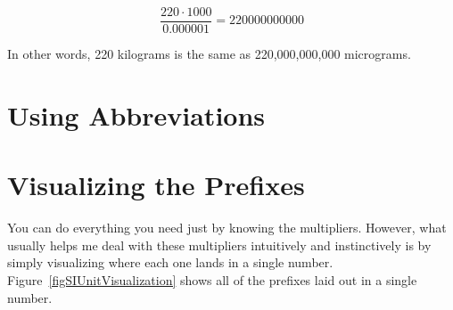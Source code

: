$$\frac{220 \cdot 1000}{0.000001} = 220000000000$$

In other words, 220 kilograms is the same as 220,000,000,000 micrograms.

\section{Using Abbreviations}

\section{Visualizing the Prefixes}

You can do everything you need just by knowing the multipliers.
However, what usually helps me deal with these multipliers intuitively and instinctively is by simply visualizing where each one lands in a single number.
Figure~\ref{figSIUnitVisualization} shows all of the prefixes laid out in a single number.


